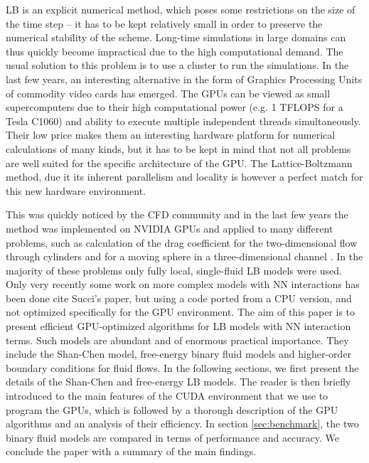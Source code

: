 \documentclass[mathpazo]{cicp}
\begin{document}
LB is an explicit numerical method, which poses some restrictions on the size of the time step --
it has to be kept relatively small in order to preserve the numerical stability of the scheme.  Long-time
simulations in large domains can thus quickly become impractical due to the high computational demand.
The usual solution to this problem is to use a cluster to run the simulations.  In the last few
years, an interesting alternative in the form of Graphics Processing Units of commodity video
cards has emerged.  The GPUs can be viewed as small supercomputers due to their high
computational power (e.g. 1 TFLOPS for a Tesla C1060) and ability to execute multiple
independent threads simultaneously.  Their low price makes them an interesting hardware
platform for numerical calculations of many kinds, but it has to be kept in mind that not
all problems are well suited for the specific architecture of the GPU.  The Lattice-Boltzmann
method, due it its inherent parallelism and locality is however a perfect match for this
new hardware environment.

This was quickly noticed by the CFD community and in the last few years the method was
implemented on NVIDIA GPUs and applied to many different problems, such as calculation of
the drag coefficient for the two-dimensional flow through cylinders \cite{tolke-twod} and
for a moving sphere in a three-dimensional channel \cite{tolke-GPU}.  In the majority of these
problems only fully local, single-fluid LB models were used.  Only very recently some
work on more complex models with NN interactions has been done {\color{red} cite Succi's paper},
but using a code ported from a CPU version, and not optimized specifically for the GPU
environment.
The aim of this paper is to present efficient GPU-optimized algorithms for LB models
with NN interaction terms.  Such models are abundant and of enormous practical importance.
They include the Shan-Chen model, free-energy binary fluid models and higher-order
boundary conditions for fluid flows.  In the following sections, we first present
the details of the Shan-Chen and free-energy LB models.  The reader
is then briefly introduced to the main features of the CUDA environment
that we use to program the GPUs, which is followed by a thorough description
of the GPU algorithms and an analysis of their efficiency.  In section \ref{sec:benchmark}, the two
binary fluid models are compared in terms of performance and accuracy.
We conclude the paper with a summary of the main findings.
\end{document}
